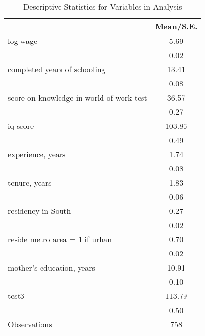 \begin{table}[htbp]\centering
\caption{Descriptive Statistics for Variables in Analysis}
\begin{tabular}{l*{1}{c}}
\hline\hline
                    &   Mean/S.E.\\
\hline
log wage            &        5.69\\
                    &        0.02\\
completed years of schooling&       13.41\\
                    &        0.08\\
score on knowledge in world of work test&       36.57\\
                    &        0.27\\
iq score            &      103.86\\
                    &        0.49\\
experience, years   &        1.74\\
                    &        0.08\\
tenure, years       &        1.83\\
                    &        0.06\\
residency in South  &        0.27\\
                    &        0.02\\
reside metro area = 1 if urban&        0.70\\
                    &        0.02\\
mother's education, years&       10.91\\
                    &        0.10\\
test3               &      113.79\\
                    &        0.50\\
\hline
Observations        &         758\\
\hline\hline
\end{tabular}
\end{table}
